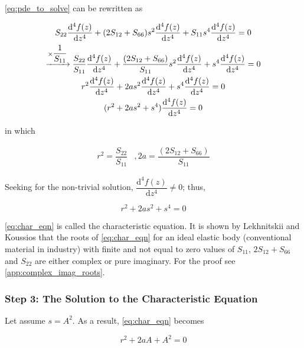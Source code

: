 \documentclass{article}
\begin{document}
\cref{eq:pde_to_solve} can be rewritten as 

\begin{gather}
    S_{22} \frac{\mathrm{d}^4 f(z)}{\mathrm{d} z^4} + (2 S_{12} + S_{66}) s^2 \frac{\mathrm{d}^4 f(z)}{\mathrm{d} z^4} + S_{11} s^4 \frac{\mathrm{d}^4 f(z)}{\mathrm{d} z^4} = 0 \notag\\
    \xrightarrow[]{\times \dfrac{1}{S_{11}}} \dfrac{S_{22}}{S_{11}} \frac{\mathrm{d}^4 f(z)}{\mathrm{d} z^4} + \dfrac{(2 S_{12} + S_{66})}{S_{11}} s^2 \frac{\mathrm{d}^4 f(z)}{\mathrm{d} z^4} + s^4 \frac{\mathrm{d}^4 f(z)}{\mathrm{d} z^4} = 0 \notag\\
    r^2 \frac{\mathrm{d}^4 f(z)}{\mathrm{d} z^4} + 2a s^2\frac{\mathrm{d}^4 f(z)}{\mathrm{d} z^4} + s^4 \frac{\mathrm{d}^4 f(z)}{\mathrm{d} z^4} = 0 \notag\\
    (r^2 + 2a s^2 + s^4) \frac{\mathrm{d}^4 f(z)}{\mathrm{d} z^4} = 0
\end{gather}

in which 

\begin{equation}
    \begin{matrix}
    r^2 = \dfrac{S_{22}}{S_{11}} & , 
    2a = \dfrac{(2 S_{12} + S_{66})}{S_{11}}
    \end{matrix}
    \label{eq:r_a}
\end{equation}

Seeking for the non-trivial solution, $\dfrac{\mathrm{d}^4 f(z)}{\mathrm{d} z^4} \neq 0$; thus,

\begin{equation}
    r^2 + 2a s^2 + s^4 = 0
    \label{eq:char_eqn}
\end{equation}

\cref{eq:char_eqn} is called the characteristic equation. It is shown by Lekhnitskii \cite{Lekhnitskiy1937} and Koussios \cite{Koussios2015} that the roots of \cref{eq:char_eqn} for an ideal elastic body (conventional material in industry) with finite and not equal to zero values of $S_{11}$, $2S_{12}+S_{66}$ and $S_{22}$ are either complex or pure imaginary. For the proof see \cref{app:complex_imag_roots}.

\subsubsection{Step 3: The Solution to the Characteristic Equation}
Let assume $s = A^2$. As a result, \cref{eq:char_eqn} becomes

\begin{equation*}
    r^2 + 2a A + A^2 = 0
\end{equation*}
\end{document}

